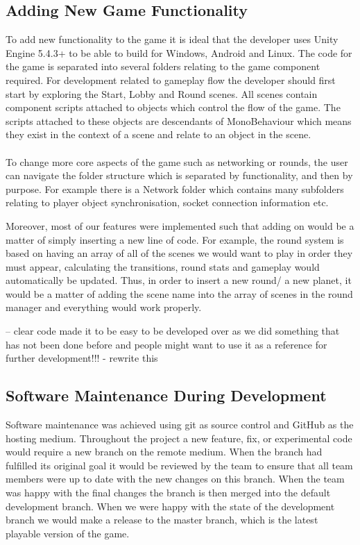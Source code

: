 \documentclass[11pt,a4paper]{article}
\begin{document}
 \subsection{Adding New Game Functionality}
 To add new functionality to the game it is ideal that the developer uses Unity Engine 5.4.3+ to be able to build for Windows, Android and Linux. The code for the game is separated into several folders relating to the game component required. For development related to gameplay flow the developer should first start by exploring the Start, Lobby and Round scenes. All scenes contain component scripts attached to objects which control the flow of the game. The scripts attached to these objects are descendants of MonoBehaviour which means they exist in the context of a scene and relate to an object in the scene.\\ \\
 To change more core aspects of the game such as networking or rounds, the user can navigate the folder structure which is separated by functionality, and then by purpose. For example there is a Network folder which contains many subfolders relating to player object synchronisation, socket connection information etc.

 Moreover, most of our features were implemented such that adding on would be a matter of simply inserting a new line of code. For example, the round system is based on having an array of all of the scenes we would want to play in order they must appear, calculating the transitions, round stats and gameplay would automatically be updated. Thus, in order to insert a new round/ a new planet, it would be a matter of adding the scene name into the array of scenes in the round manager and everything would work properly.

 -- clear code made it to be easy to be developed over as we did something that has not been done before and people might want to use it as a reference for further development!!! - rewrite this

 \subsection{Software Maintenance During Development}
 Software maintenance was achieved using git as source control and GitHub as the hosting medium. Throughout the project a new feature, fix, or experimental code would require a new branch on the remote medium. When the branch had fulfilled its original goal it would be reviewed by the team to ensure that all team members were up to date with the new changes on this branch. When the team was happy with the final changes the branch is then merged into the default development branch. When we were happy with the state of the development branch we would make a release to the master branch, which is the latest playable version of the game.
\end{document}
